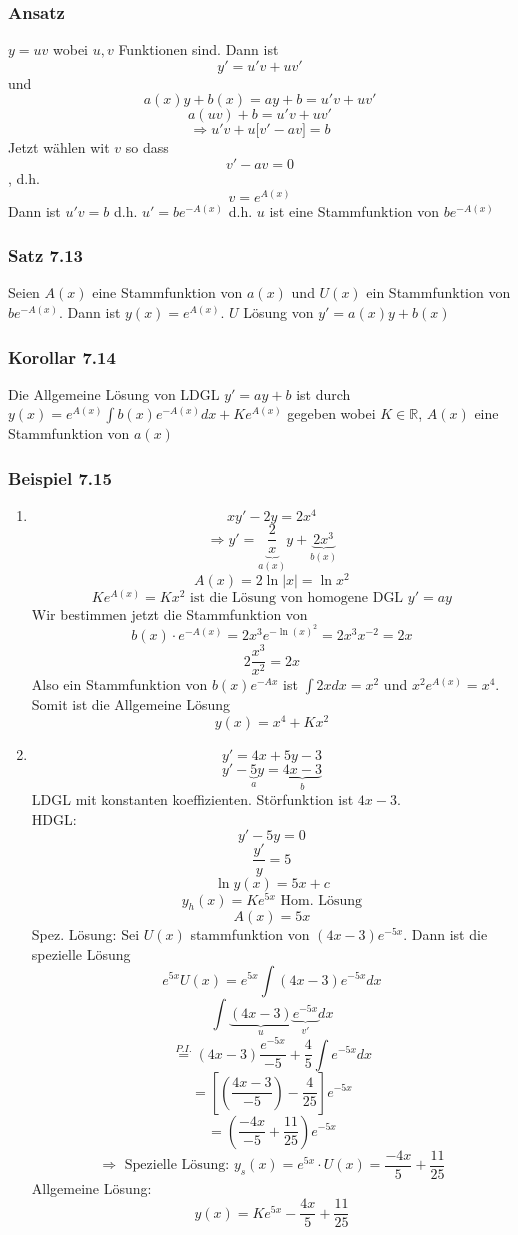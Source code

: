 \subsubsection*{Ansatz}
$y=uv$ wobei $u,v$ Funktionen sind. Dann ist \[y'=u'v+uv'\] und \[a(x)y+b(x)=ay+b=u'v+uv'\]
\[a(uv)+b=u'v+uv'\]
\[\Rightarrow u'v+u\lbrack v'-av\rbrack =b\]
Jetzt wählen wit $v$ so dass \[v'-av=0\], d.h. \[v=e^{A(x)}\] Dann ist $u'v=b$ d.h. $u'=be^{-A(x)}$ d.h. $u$ ist eine Stammfunktion von $be^{-A(x)}$

\subsubsection*{Satz 7.13}
Seien $A(x)$ eine Stammfunktion von $a(x)$ und $U(x)$ ein Stammfunktion von $be^{-A(x)}$. Dann ist $y(x)=e^{A(x)}$. $U$ Lösung von $y'=a(x)y+b(x)$

\subsubsection*{Korollar 7.14}
Die Allgemeine Lösung von LDGL $y'=ay+b$ ist durch $y(x)=e^{A(x)}\int{b(x)e^{-A(x)} dx}+Ke^{A(x)}$ gegeben wobei $K\in\mathbb{R}$, $A(x)$ eine Stammfunktion von $a(x)$

\subsubsection*{Beispiel 7.15}
\begin{enumerate}
\item \[xy'-2y=2x^4\]
\[\Rightarrow y' = \underbrace {\frac{2}{x}}_{a(x)}y + \underbrace {2{x^3}}_{b(x)}\]
\[A(x)=2\ln\left| x \right|=\ln x^2\]
\[Ke^{A(x)}=Kx^2\text{ ist die Lösung von homogene DGL }y'=ay\]
Wir bestimmen jetzt die Stammfunktion von \[b(x)\cdot e^{-A(x)}=2x^3e^{-\ln (x)^2}=2x^3 x^{-2}=2x\]
\[2\frac{x^3}{x^2}=2x\]
Also ein Stammfunktion von $b(x)e^{-Ax}$ ist  $\int{2xdx=x^2}$ und $x^2e^{A(x)}=x^4$. Somit ist die Allgemeine Lösung \[y(x)=x^4+Kx^2\]
\item \[y'=4x+5y-3\]
\[y' - \underbrace 5_ay = \underbrace {4x - 3}_b\]
LDGL mit konstanten koeffizienten. Störfunktion ist  $4x-3$.\\

\noindent HDGL: \[y'-5y=0\]
\[\frac{y'}{y}=5\]
\[\ln y(x)=5x+c\]
\[y_h(x)=Ke^{5x} \text{ Hom. Lösung}\]
\[A(x)=5x\]
Spez. Lösung: Sei $U(x)$ stammfunktion von $(4x-3)e^{-5x}$. Dann ist die spezielle Lösung \[e^{5x}U(x)=e^{5x}\int{(4x-3)e^{-5x}dx}\]
\[ \int {\underbrace {(4x - 3)}_u\underbrace {{e^{ - 5x}}}_{v'}dx} \]
\[\mathop = \limits^{P.I.} (4x - 3)\frac{{{e^{ - 5x}}}}{{ - 5}} + \frac{4}{5}\int {{e^{ - 5x}}dx}\]
\[ = \left[ {\left( {\frac{{4x - 3}}{{ - 5}}} \right) - \frac{4}{{25}}} \right]{e^{ - 5x}}\]
\[ = \left( {\frac{{ - 4x}}{{ - 5}} + \frac{{11}}{{25}}} \right){e^{ - 5x}}\]
\[\Rightarrow \text{ Spezielle Lösung: }y_s(x)=e^{5x}\cdot U(x)=\frac{-4x}{5}+\frac{11}{25}\]
Allgemeine Lösung: \[y(x)=Ke^{5x}-\frac{4x}{5}+\frac{11}{25}\]
\end{enumerate}

